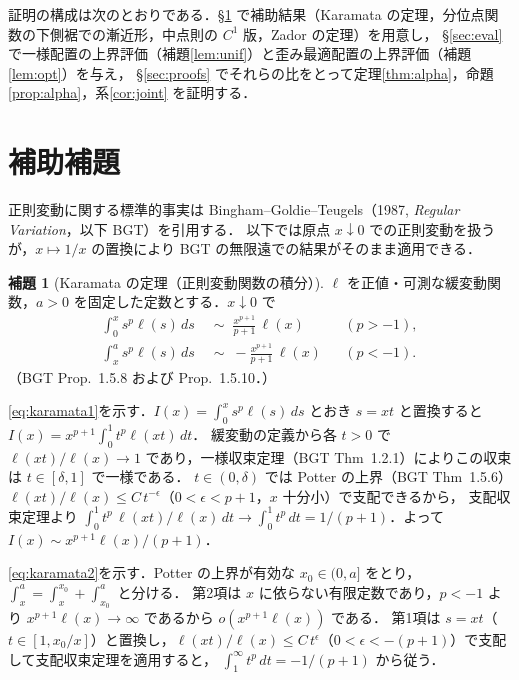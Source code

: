 \documentclass[a4paper,10pt]{jsarticle}
\makeatletter
\theoremstyle{definition}
\newtheorem{lemma}{補題}[section]
\renewenvironment{proof}[1][\proofname]{\par
  \pushQED{\qed}%
  \normalfont \topsep6\p@\@plus6\p@\relax
  \trivlist
  \item[\hskip\labelsep\textbf{#1}]\ignorespaces
}{%
  \popQED\endtrivlist\@endpefalse
}
\renewcommand{\proofname}{証明}
\makeatother
\begin{document}
証明の構成は次のとおりである．§\ref{sec:aux} で補助結果（Karamata の定理，分位点関数の下側裾での漸近形，中点則の $C^1$ 版，Zador の定理）を用意し，
§\ref{sec:eval} で一様配置の上界評価（補題\ref{lem:unif}）と歪み最適配置の上界評価（補題\ref{lem:opt}）を与え，
§\ref{sec:proofs} でそれらの比をとって定理\ref{thm:alpha}，命題\ref{prop:alpha}，系\ref{cor:joint} を証明する．

\section{補助補題}
\label{sec:aux}

正則変動に関する標準的事実は Bingham--Goldie--Teugels（1987, \textit{Regular Variation}，以下 BGT）を引用する．
以下では原点 $x\downarrow0$ での正則変動を扱うが，$x\mapsto1/x$ の置換により BGT の無限遠での結果がそのまま適用できる．

\begin{lemma}[Karamata の定理（正則変動関数の積分）]
\label{lem:karamata}
$\ell$ を正値・可測な緩変動関数，$a>0$ を固定した定数とする．$x\downarrow0$ で
\begin{align}
  \int_0^x s^{p}\ell(s)\,ds&\;\sim\;\frac{x^{p+1}}{p+1}\,\ell(x)&&(p>-1),\label{eq:karamata1}\\
  \int_x^{a} s^{p}\ell(s)\,ds&\;\sim\;-\frac{x^{p+1}}{p+1}\,\ell(x)&&(p<-1).\label{eq:karamata2}
\end{align}
（BGT Prop.~1.5.8 および Prop.~1.5.10．）
\end{lemma}
\begin{proof}
\eqref{eq:karamata1}を示す．$I(x)=\int_0^x s^p\ell(s)\,ds$ とおき $s=xt$ と置換すると $I(x)=x^{p+1}\int_0^1 t^p\ell(xt)\,dt$．
緩変動の定義から各 $t>0$ で $\ell(xt)/\ell(x)\to1$ であり，一様収束定理（BGT Thm~1.2.1）によりこの収束は $t\in[\delta,1]$ で一様である．
$t\in(0,\delta)$ では Potter の上界（BGT Thm~1.5.6）$\ell(xt)/\ell(x)\le C\,t^{-\epsilon}$（$0<\epsilon<p+1$，$x$ 十分小）で支配できるから，
支配収束定理より $\int_0^1 t^p\,\ell(xt)/\ell(x)\,dt\to\int_0^1 t^p\,dt=1/(p+1)$．よって $I(x)\sim x^{p+1}\ell(x)/(p+1)$．

\eqref{eq:karamata2}を示す．Potter の上界が有効な $x_0\in(0,a]$ をとり，$\int_x^a=\int_x^{x_0}+\int_{x_0}^a$ と分ける．
第2項は $x$ に依らない有限定数であり，$p<-1$ より $x^{p+1}\ell(x)\to\infty$ であるから $o(x^{p+1}\ell(x))$ である．
第1項は $s=xt$（$t\in[1,x_0/x]$）と置換し，$\ell(xt)/\ell(x)\le C\,t^{\epsilon}$（$0<\epsilon<-(p+1)$）で支配して支配収束定理を適用すると，
$\int_1^\infty t^p\,dt=-1/(p+1)$ から従う．
\end{proof}
\end{document}
